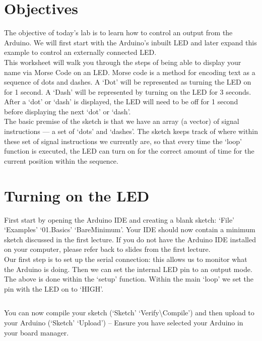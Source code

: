 \documentclass[11pt,a4paper]{article}
\begin{document}
\pagestyle{fancy}

\section*{Objectives}

The objective of today's lab is to learn how to control an output from the Arduino. We will first start with the Arduino's inbuilt LED and later expand this example to control an externally connected LED.\\

\noindent
This worksheet will walk you through the steps of being able to display your name via Morse Code on an LED. Morse code is a method for encoding text as a sequence of dots and dashes. A `Dot' will be represented as turning the LED on for 1 second. A `Dash' will be represented by turning on the LED for 3 seconds. After a `dot' or `dash' is displayed, the LED will need to be off for 1 second before displaying the next `dot' or `dash'.\\

\noindent
The basic premise of the sketch is that we have an array (a vector) of signal instructions --- a set of `dots' and `dashes'. The sketch keeps track of where within these set of signal instructions we currently are, so that every time the `loop' function is executed, the LED can turn on for the correct amount of time for the current position within the sequence.

\section{Turning on the LED}
First start by opening the Arduino IDE and creating a blank sketch: `File' \textrightarrow `Examples' \textrightarrow `01.Basics' \textrightarrow `BareMinimum'. Your IDE should now contain a minimum sketch discussed in the first lecture. If you do not have the Arduino IDE installed on your computer, please refer back to slides from the first lecture.\\

\noindent
Our first step is to set up the serial connection: this allows us to monitor what the Arduino is doing. Then we can set the internal LED pin to an output mode. The above is done within the `setup' function. Within the main `loop' we set the pin with the LED on to `HIGH'.

\inputminted{arduino}{./src/1-led-on.txt}

\noindent
You can now compile your sketch (`Sketch' \textrightarrow `Verify\textbackslash Compile') and then upload to your Arduino (`Sketch' \textrightarrow `Upload') -- Ensure you have selected your Arduino in your board manager.
\end{document}
